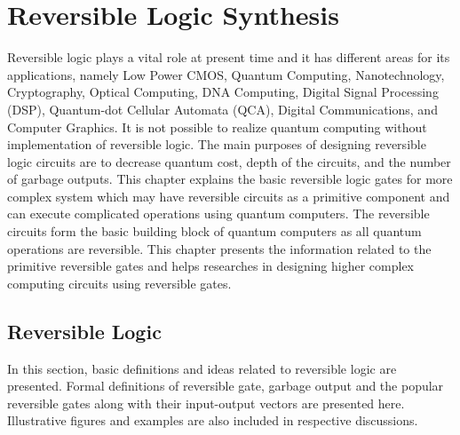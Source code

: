 

\chapter{Reversible Logic Synthesis}
\label{ch:part1_chapter1}


Reversible logic plays a vital  role  at present time and it has different areas for its applications, namely Low Power CMOS, Quantum Computing, Nanotechnology, Cryptography,
Optical Computing, DNA  Computing, Digital Signal  Processing (DSP), Quantum-dot Cellular Automata (QCA),  Digital Communications, and Computer Graphics. It is not possible to realize quantum computing without implementation of reversible logic. The main purposes of designing reversible logic circuits are to decrease quantum cost, depth of the circuits, and the number of garbage outputs.%
This chapter explains the basic reversible logic gates for more complex system which may have reversible circuits as a primitive component and can execute complicated operations using quantum computers. The reversible circuits form the basic building block of quantum computers as all quantum operations are reversible. This chapter presents the information related to the primitive reversible gates and helps researches in designing higher complex computing circuits using reversible gates.
 
 
\section{Reversible Logic}
 In this section, basic definitions and ideas related to reversible logic are presented. Formal definitions of reversible gate, garbage output and the popular reversible gates along with their input-output vectors are presented here.
 Illustrative figures and examples are also included in respective discussions.
 
